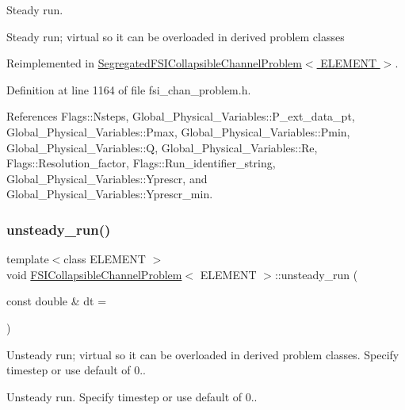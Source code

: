 Steady run. 

Steady run; virtual so it can be overloaded in derived problem classes 

Reimplemented in \hyperlink{classSegregatedFSICollapsibleChannelProblem_a9a6b0dfeda9eb0d4c50e195768c93e37}{Segregated\+F\+S\+I\+Collapsible\+Channel\+Problem$<$ E\+L\+E\+M\+E\+N\+T $>$}.



Definition at line 1164 of file fsi\+\_\+chan\+\_\+problem.\+h.



References Flags\+::\+Nsteps, Global\+\_\+\+Physical\+\_\+\+Variables\+::\+P\+\_\+ext\+\_\+data\+\_\+pt, Global\+\_\+\+Physical\+\_\+\+Variables\+::\+Pmax, Global\+\_\+\+Physical\+\_\+\+Variables\+::\+Pmin, Global\+\_\+\+Physical\+\_\+\+Variables\+::Q, Global\+\_\+\+Physical\+\_\+\+Variables\+::\+Re, Flags\+::\+Resolution\+\_\+factor, Flags\+::\+Run\+\_\+identifier\+\_\+string, Global\+\_\+\+Physical\+\_\+\+Variables\+::\+Yprescr, and Global\+\_\+\+Physical\+\_\+\+Variables\+::\+Yprescr\+\_\+min.

\mbox{\label{classFSICollapsibleChannelProblem_ae4f2b3abaf5e2dfc35489548d5a72edc}} 
\subsubsection{\texorpdfstring{unsteady\+\_\+run()}{unsteady\_run()}}
{\footnotesize\ttfamily template$<$class E\+L\+E\+M\+E\+NT $>$ \\
void \hyperlink{classFSICollapsibleChannelProblem}{F\+S\+I\+Collapsible\+Channel\+Problem}$<$ E\+L\+E\+M\+E\+NT $>$\+::unsteady\+\_\+run (\begin{DoxyParamCaption}\item[{const double \&}]{dt = {} }\end{DoxyParamCaption})\hspace{0.3cm}{\ttfamily [virtual]}}



Unsteady run; virtual so it can be overloaded in derived problem classes. Specify timestep or use default of 0.. 

Unsteady run. Specify timestep or use default of 0.. 

